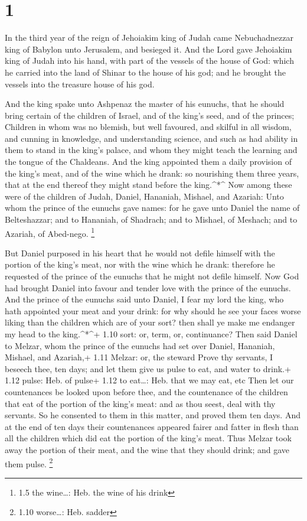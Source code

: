 \hypertarget{section}{%
\section{1}\label{section}}

 In the third year of the reign of Jehoiakim king of Judah
came Nebuchadnezzar king of Babylon unto Jerusalem, and besieged it.
 And the Lord gave Jehoiakim king of Judah into his hand,
with part of the vessels of the house of God: which he carried into the
land of Shinar to the house of his god; and he brought the vessels into
the treasure house of his god.

 And the king spake unto Ashpenaz the master of his eunuchs,
that he should bring certain of the children of Israel, and of the
king's seed, and of the princes;  Children in whom was no
blemish, but well favoured, and skilful in all wisdom, and cunning in
knowledge, and understanding science, and such as had ability in them to
stand in the king's palace, and whom they might teach the learning and
the tongue of the Chaldeans.  And the king appointed them a
daily provision of the king's meat, and of the wine which he drank: so
nourishing them three years, that at the end thereof they might stand
before the king.\^{}*\^{}  Now among these were of the
children of Judah, Daniel, Hananiah, Mishael, and Azariah: 
Unto whom the prince of the eunuchs gave names: for he gave unto Daniel
the name of Belteshazzar; and to Hananiah, of Shadrach; and to Mishael,
of Meshach; and to Azariah, of Abed-nego. \footnote{1.5 the wine\ldots:
  Heb. the wine of his drink}

 But Daniel purposed in his heart that he would not defile
himself with the portion of the king's meat, nor with the wine which he
drank: therefore he requested of the prince of the eunuchs that he might
not defile himself.  Now God had brought Daniel into favour
and tender love with the prince of the eunuchs.  And the
prince of the eunuchs said unto Daniel, I fear my lord the king, who
hath appointed your meat and your drink: for why should he see your
faces worse liking than the children which are of your sort? then shall
ye make me endanger my head to the king.\^{}*\^{}+ 1.10 sort: or, term,
or, continuance?  Then said Daniel to Melzar, whom the
prince of the eunuchs had set over Daniel, Hananiah, Mishael, and
Azariah,+ 1.11 Melzar: or, the steward  Prove thy servants,
I beseech thee, ten days; and let them give us pulse to eat, and water
to drink.+ 1.12 pulse: Heb. of pulse+ 1.12 to eat\ldots: Heb. that we
may eat, etc  Then let our countenances be looked upon
before thee, and the countenance of the children that eat of the portion
of the king's meat: and as thou seest, deal with thy servants.
 So he consented to them in this matter, and proved them
ten days.  And at the end of ten days their countenances
appeared fairer and fatter in flesh than all the children which did eat
the portion of the king's meat.  Thus Melzar took away the
portion of their meat, and the wine that they should drink; and gave
them pulse. \footnote{1.10 worse\ldots: Heb. sadder}

